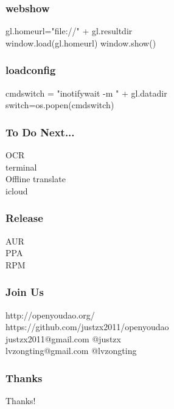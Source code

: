 \documentclass[10pt]{beamer}
\begin{document}
\begin{frame}
  \frametitle{webshow}

gl.homeurl="file://" + gl.resultdir\\
window.load(gl.homeurl)
window.show()  
\end{frame}

\begin{frame}
  \frametitle{loadconfig}

cmdswitch = "inotifywait  -m " + gl.datadir\\
switch=os.popen(cmdswitch)\\
\end{frame}

\begin{frame}
  \frametitle{To Do Next...}

OCR\\
terminal\\
Offline translate\\
icloud
\end{frame}

\begin{frame}
  \frametitle{Release}

AUR\\
PPA\\
RPM
\end{frame}

\begin{frame}
  \frametitle{Join Us}

http://openyoudao.org/\\
https://github.com/justzx2011/openyoudao\\
justzx2011@gmail.com  @justzx\\
lvzongting@gmail.com  @lvzongting\\

\end{frame}

\begin{frame}
  \frametitle{Thanks}
Thanks!
\end{frame}

\end{document}
